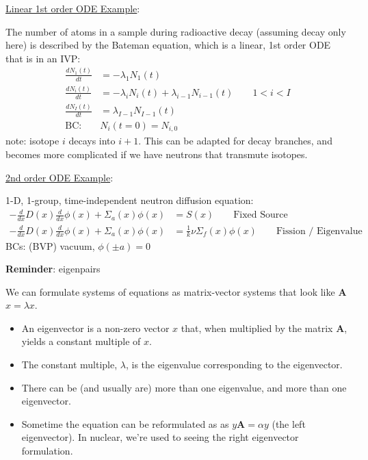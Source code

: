 \documentclass[12pt]{article}
\newcommand{\ve}[1]{\ensuremath{\mathbf{#1}}}
\newcommand{\Macro}{\ensuremath{\Sigma}}
\begin{document}
\vspace*{1em}
\noindent \underline{Linear 1st order ODE Example}:

The number of atoms in a sample during radioactive decay (assuming decay only here) is described by the Bateman equation, which is a linear, 1st order ODE that is in an IVP:
%
\begin{align}
\frac{dN_1(t)}{dt} &= -\lambda_1 N_1(t) \nonumber \\
\frac{dN_i(t)}{dt} &= -\lambda_i N_i(t) + \lambda_{i-1}N_{i-1}(t) \qquad 1 < i < I \nonumber\\
\frac{dN_I(t)}{dt} &= \lambda_{I-1} N_{I-1}(t) \nonumber \\
\text{BC: }& N_i(t=0) = N_{i,0}\nonumber
\end{align}
%
note: isotope $i$ decays into $i+1$. This can be adapted for decay branches, and becomes more complicated if we have neutrons that transmute isotopes. 

\vspace*{1em}
\underline{2nd order ODE Example}:

1-D, 1-group, time-independent neutron diffusion equation:
%
\begin{align}
-\frac{d}{dx}D(x)\frac{d}{dx}\phi(x) + \Macro_a(x)\phi(x) &= S(x) \qquad \text{Fixed Source} \nonumber \\
-\frac{d}{dx}D(x)\frac{d}{dx}\phi(x) + \Macro_a(x)\phi(x) &= \frac{1}{k} \nu \Macro_f(x) \phi(x)\qquad \text{Fission / Eigenvalue} \nonumber
\end{align}
%
BCs: (BVP) vacuum, $\phi(\pm a) = 0$


\vspace*{1 em} \textbf{Reminder}: eigenpairs

We can formulate systems of equations as matrix-vector systems that look like \ve{A}$x = \lambda x$. 
\begin{itemize}
\item An eigenvector is a non-zero vector $x$ that, when multiplied by the matrix \ve{A}, yields a constant multiple of $x$. 
\item The constant multiple, $\lambda$, is the eigenvalue corresponding to the eigenvector.
\item There can be (and usually are) more than one eigenvalue, and more than one eigenvector. 
\item Sometime the equation can be reformulated as as $y\ve{A} = \alpha y$ (the left eigenvector). In nuclear, we're used to seeing the right eigenvector formulation.
\end{itemize}
\end{document}
